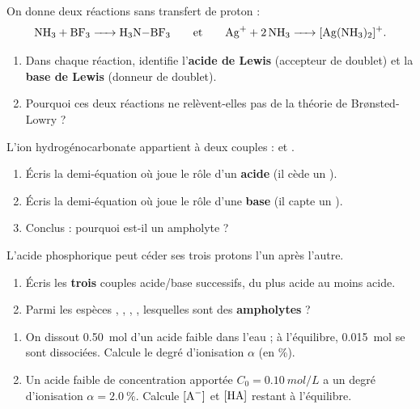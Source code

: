 \documentclass[11pt,a4paper]{article}
\begin{document}

\begin{exo}
On donne deux réactions sans transfert de proton :
\[ \ce{NH3 + BF3 -> H3N-BF3} \qquad\text{et}\qquad \ce{Ag+ + 2 NH3 -> [Ag(NH3)2]+}. \]
\begin{enumerate}[label=\alph*)]
  \item Dans chaque réaction, identifie l'\textbf{acide de Lewis} (accepteur de doublet) et la \textbf{base de
        Lewis} (donneur de doublet).
  \item Pourquoi ces deux réactions ne relèvent-elles pas de la théorie de Brønsted-Lowry ?
\end{enumerate}
\end{exo}

\begin{exo}
L'ion hydrogénocarbonate  appartient à deux couples :  et .
\begin{enumerate}[label=\alph*)]
  \item Écris la demi-équation où  joue le rôle d'un \textbf{acide} (il cède un ).
  \item Écris la demi-équation où  joue le rôle d'une \textbf{base} (il capte un ).
  \item Conclus : pourquoi  est-il un ampholyte ?
\end{enumerate}
\end{exo}

\begin{exo}
L'acide phosphorique  peut céder ses trois protons l'un après l'autre.
\begin{enumerate}[label=\alph*)]
  \item Écris les \textbf{trois} couples acide/base successifs, du plus acide au moins acide.
  \item Parmi les espèces , , , , lesquelles sont des
        \textbf{ampholytes} ?
\end{enumerate}
\end{exo}

\begin{exo}
\begin{enumerate}[label=\alph*)]
  \item On dissout \qty{0,50}{mol} d'un acide faible dans l'eau ; à l'équilibre, \qty{0,015}{mol} se sont
        dissociées. Calcule le degré d'ionisation $\alpha$ (en \%).
  \item Un acide faible  de concentration apportée $C_0 = \qty{0,10}{mol\per L}$ a un degré
        d'ionisation $\alpha = \qty{2,0}{\percent}$. Calcule $[\ce{A-}]$ et $[\ce{HA}]$ restant à l'équilibre.
\end{enumerate}
\end{exo}
\end{document}
